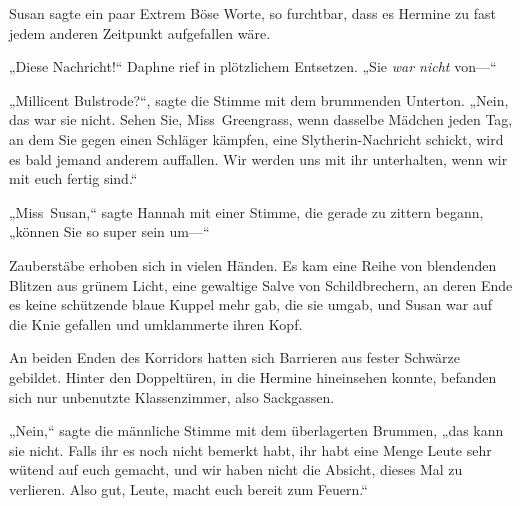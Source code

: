 Susan sagte ein paar Extrem Böse Worte, so furchtbar, dass es Hermine zu fast jedem anderen Zeitpunkt aufgefallen wäre.

„Diese Nachricht!“ Daphne rief in plötzlichem Entsetzen. „Sie \emph{war nicht} von—“

„Millicent Bulstrode?“, sagte die Stimme mit dem brummenden Unterton. „Nein, das war sie nicht. Sehen Sie, Miss~Greengrass, wenn dasselbe Mädchen jeden Tag, an dem Sie gegen einen Schläger kämpfen, eine Slytherin-Nachricht schickt, wird es bald jemand anderem auffallen. Wir werden uns mit ihr unterhalten, wenn wir mit euch fertig sind.“

„Miss~Susan,“ sagte Hannah mit einer Stimme, die gerade zu zittern begann, „können Sie so super sein um—“

Zauberstäbe erhoben sich in vielen Händen. Es kam eine Reihe von blendenden Blitzen aus grünem Licht, eine gewaltige Salve von Schildbrechern, an deren Ende es keine schützende blaue Kuppel mehr gab, die sie umgab, und Susan war auf die Knie gefallen und umklammerte ihren Kopf.

An beiden Enden des Korridors hatten sich Barrieren aus fester Schwärze gebildet. Hinter den Doppeltüren, in die Hermine hineinsehen konnte, befanden sich nur unbenutzte Klassenzimmer, also Sackgassen.

„Nein,“ sagte die männliche Stimme mit dem überlagerten Brummen, „das kann sie nicht. Falls ihr es noch nicht bemerkt habt, ihr habt eine Menge Leute sehr wütend auf euch gemacht, und wir haben nicht die Absicht, dieses Mal zu verlieren. Also gut, Leute, macht euch bereit zum Feuern.“


